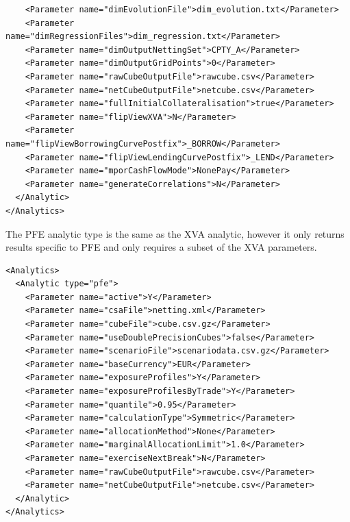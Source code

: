 \begin{listing}[H]
\begin{verbatim}
    <Parameter name="dimEvolutionFile">dim_evolution.txt</Parameter>
    <Parameter name="dimRegressionFiles">dim_regression.txt</Parameter>
    <Parameter name="dimOutputNettingSet">CPTY_A</Parameter>
    <Parameter name="dimOutputGridPoints">0</Parameter>
    <Parameter name="rawCubeOutputFile">rawcube.csv</Parameter>
    <Parameter name="netCubeOutputFile">netcube.csv</Parameter>
    <Parameter name="fullInitialCollateralisation">true</Parameter>
    <Parameter name="flipViewXVA">N</Parameter>
    <Parameter name="flipViewBorrowingCurvePostfix">_BORROW</Parameter>
    <Parameter name="flipViewLendingCurvePostfix">_LEND</Parameter>
    <Parameter name="mporCashFlowMode">NonePay</Parameter>
    <Parameter name="generateCorrelations">N</Parameter>
  </Analytic>
</Analytics>
\end{verbatim}
\caption{ORE analytic: xva}
\label{lst:ore_xva}
\end{listing}

The PFE analytic type is the same as the XVA analytic, however it only returns results specific to PFE and only requires a subset of the XVA parameters.

\begin{listing}[H]
\begin{verbatim}
<Analytics>
  <Analytic type="pfe">
    <Parameter name="active">Y</Parameter>
    <Parameter name="csaFile">netting.xml</Parameter>
    <Parameter name="cubeFile">cube.csv.gz</Parameter>
    <Parameter name="useDoublePrecisionCubes">false</Parameter>
    <Parameter name="scenarioFile">scenariodata.csv.gz</Parameter>
    <Parameter name="baseCurrency">EUR</Parameter>
    <Parameter name="exposureProfiles">Y</Parameter>
    <Parameter name="exposureProfilesByTrade">Y</Parameter>
    <Parameter name="quantile">0.95</Parameter>
    <Parameter name="calculationType">Symmetric</Parameter>
    <Parameter name="allocationMethod">None</Parameter>
    <Parameter name="marginalAllocationLimit">1.0</Parameter>
    <Parameter name="exerciseNextBreak">N</Parameter>
    <Parameter name="rawCubeOutputFile">rawcube.csv</Parameter>
    <Parameter name="netCubeOutputFile">netcube.csv</Parameter>
  </Analytic>
</Analytics>
\end{verbatim}
\caption{ORE analytic: xva}
\label{lst:ore_xva}
\end{listing}

